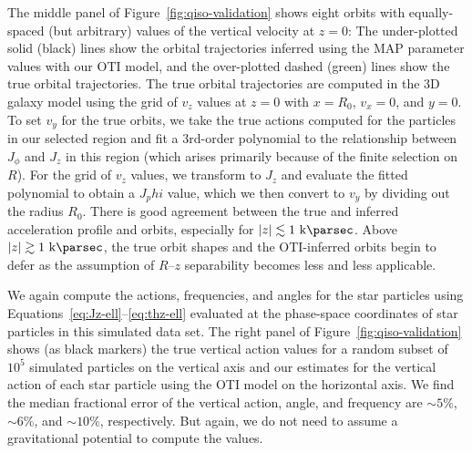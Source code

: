 The middle panel of Figure~\ref{fig:qiso-validation} shows eight orbits with
equally-spaced (but arbitrary) values of the vertical velocity at $z=0$: The
under-plotted solid (black) lines show the orbital trajectories inferred using the MAP
parameter values with our OTI model, and the over-plotted dashed (green) lines show the
true orbital trajectories.
The true orbital trajectories are computed in the 3D galaxy model using the grid of
$v_z$ values at $z=0$ with $x=R_0$, $v_x=0$, and $y=0$.
To set $v_y$ for the true orbits, we take the true actions computed for the particles in
our selected region and fit a 3rd-order polynomial to the relationship between $J_\phi$
and $J_z$ in this region (which arises primarily because of the finite selection on
$R$).
For the grid of $v_z$ values, we transform to $J_z$ and evaluate the fitted polynomial
to obtain a $J_phi$ value, which we then convert to $v_y$ by dividing out the radius
$R_0$.
There is good agreement between the true and inferred acceleration profile and orbits,
especially for $|z| \lesssim 1~\kpc$.
Above $|z| \gtrsim 1~\kpc$, the true orbit shapes and the OTI-inferred orbits begin to
defer as the assumption of $R$--$z$ separability becomes less and less applicable.

We again compute the actions, frequencies, and angles for the star particles using
Equations~\ref{eq:Jz-ell}--\ref{eq:thz-ell} evaluated at the phase-space coordinates of
star particles in this simulated data set.
The right panel of Figure~\ref{fig:qiso-validation} shows (as black markers) the true
vertical action values for a random subset of $10^5$ simulated particles on the vertical
axis and our estimates for the vertical action of each star particle using the OTI
model on the horizontal axis.
We find the median fractional error of the vertical action, angle, and frequency are
$\sim 5\%$, $\sim 6\%$, and $\sim 10\%$, respectively.
But again, we do not need to assume a gravitational potential to compute the values.


